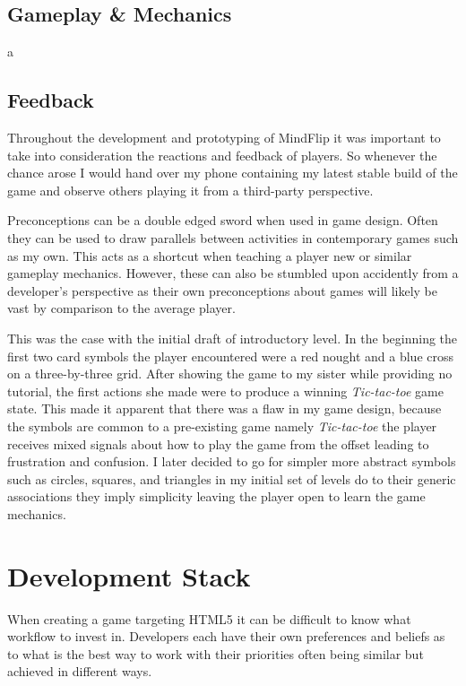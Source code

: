 \documentclass[final]{cmpreport}
\begin{document}
\subsection{Gameplay \& Mechanics}
a

\subsection{Feedback}
Throughout the development and prototyping of MindFlip it was important to take into consideration the reactions and feedback of players. So whenever the chance arose I would hand over my phone containing my latest stable build of the game and observe others playing it from a third-party perspective.

Preconceptions can be a double edged sword when used in game design. Often they can be used to draw parallels between activities in contemporary games such as my own. This acts as a shortcut when teaching a player new or similar gameplay mechanics. However, these can also be stumbled upon accidently from a developer's perspective as their own preconceptions about games will likely be vast by comparison to the average player.

This was the case with the initial draft of introductory level. In the beginning the first two card symbols the player encountered were a red nought and a blue cross on a three-by-three grid. After showing the game to my sister while providing no tutorial, the first actions she made were to produce a winning \emph{Tic-tac-toe} game state. This made it apparent that there was a flaw in my game design, because the symbols are common to a pre-existing game namely \emph{Tic-tac-toe} the player receives mixed signals about how to play the game from the offset leading to frustration and confusion. I later decided to go for simpler more abstract symbols such as circles, squares, and triangles in my initial set of levels do to their generic associations they imply simplicity leaving the player open to learn the game mechanics.

\section{Development Stack}
When creating a game targeting HTML5 it can be difficult to know what workflow to invest in. Developers each have their own preferences and beliefs as to what is the best way to work with their priorities often being similar but achieved in different ways.
\end{document}

